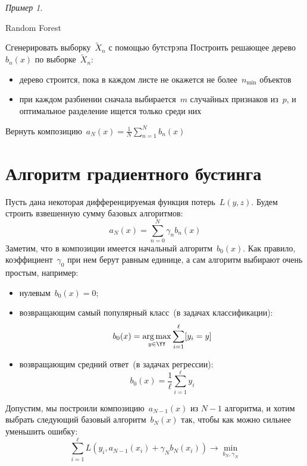 \documentclass[a4paper, 12pt]{article}
\newcommand{\argmax}{\mathop{\rm arg\,max}\limits}
\theoremstyle{plain} %
\theoremstyle{definition} %
\theoremstyle{remark} %
\newtheorem{example}{Пример}
\begin{document}
\begin{example}
\begin{centering}
	\begin{algorithm}[t]
	\caption{Random Forest}
	\label{alg:rf}
	    \begin{algorithmic}[1]
	            \STATE Сгенерировать выборку~$\tilde X_n$ с помощью бутстрэпа
	            \STATE Построить решающее дерево~$b_n(x)$ по выборке~$\tilde X_n$:
	                \begin{itemize}
	                    \item дерево строится, пока в каждом листе не окажется не более~$n_{\min}$ объектов
	                    \item при каждом разбиении сначала выбирается~$m$ случайных
	                        признаков из~$p$, и оптимальное разделение ищется только среди них
	                \end{itemize}
	        \ENDFOR
	        \STATE Вернуть композицию~$a_N(x) = \frac{1}{N} \sum_{n = 1}^{N} b_n(x)$
	    \end{algorithmic}
	\end{algorithm}
\end{centering}


\section{Алгоритм градиентного бустинга}

Пусть дана некоторая дифференцируемая функция потерь~$L(y, z)$.
Будем строить взвешенную сумму базовых алгоритмов:
\[
    a_N(x)
    =
    \sum_{n = 0}^{N}
        \gamma_n b_n(x)
\]
Заметим, что в композиции имеется начальный алгоритм~$b_0(x)$.
Как правило, коэффициент~$\gamma_0$ при нем берут равным единице,
а сам алгоритм выбирают очень простым, например:
\begin{itemize}
    \item нулевым~$b_0(x) = 0$;
    \item возвращающим самый популярный класс~(в задачах классификации):
        \[
            b_0(x) = \argmax_{y \in \YY} \sum_{i = 1}^{\ell} [y_i = y]
        \]
    \item возвращающим средний ответ~(в задачах регрессии):
        \[
            b_0(x) = \frac{1}{\ell} \sum_{i = 1}^{\ell} y_i
        \]
\end{itemize}

Допустим, мы построили композицию~$a_{N - 1}(x)$ из $N - 1$ алгоритма,
и хотим выбрать следующий базовый алгоритм~$b_N(x)$ так, чтобы как можно сильнее
уменьшить ошибку:
\[
    \sum_{i = 1}^{\ell}
        L(y_i, a_{N - 1}(x_i) + \gamma_N b_N(x_i))
    \to
    \min_{b_N, \gamma_N}
\]


\end{example}
\end{document}
